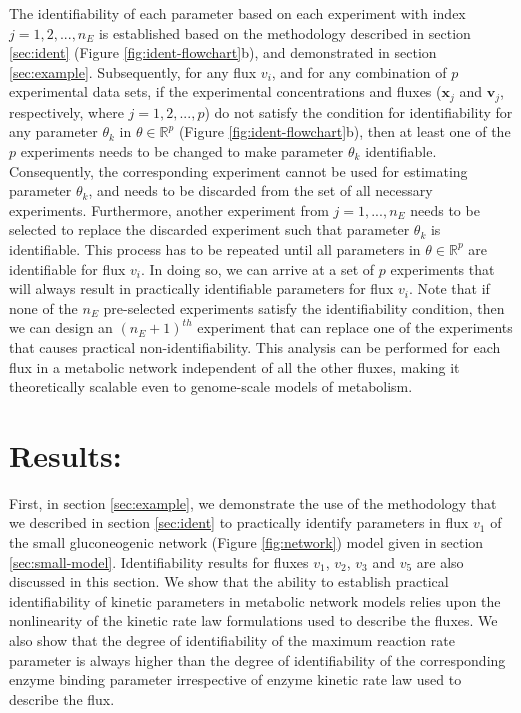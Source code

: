 \documentclass[10pt]{article}
\begin{document}
	The identifiability of each parameter based on each experiment with index $j = {1, 2, ..., n_E}$ is established based on the methodology described in section \ref{sec:ident} (Figure \ref{fig:ident-flowchart}b), and demonstrated in section \ref{sec:example}. Subsequently, for any flux $v_i$, and for any combination of $p$ experimental data sets, if the experimental concentrations and fluxes ($\mathbf{x}_j$ and $\mathbf{v}_j$, respectively, where $j = {1, 2,..., p}$) do not satisfy the condition for identifiability for any parameter $\theta_k$ in $\theta\in\mathbb{R}^p$ (Figure \ref{fig:ident-flowchart}b), then at least one of the $p$ experiments needs to be changed to make parameter $\theta_k$ identifiable. Consequently, the corresponding experiment cannot be used for estimating parameter $\theta_k$, and needs to be discarded from the set of all necessary experiments. Furthermore, another experiment from $j = {1, ..., n_E}$ needs to be selected to replace the discarded experiment such that parameter $\theta_k$ is identifiable. This process has to be repeated until all parameters in $\theta\in\mathbb{R}^p$ are identifiable for flux $v_i$. In doing so, we can arrive at a set of $p$ experiments that will always result in practically identifiable parameters for flux $v_i$. Note that if none of the $n_E$ pre-selected experiments satisfy the identifiability condition, then we can design an $(n_E+1)^{th}$ experiment that can replace one of the experiments that causes practical non-identifiability. This analysis can be performed for each flux in a metabolic network independent of all the other fluxes, making it theoretically scalable even to genome-scale models of metabolism. 	
	
	\section{Results:}
	First, in section \ref{sec:example}, we demonstrate the use of the methodology that we described in section \ref{sec:ident} to practically identify parameters in flux $v_1$ of the small gluconeogenic network (Figure \ref{fig:network}) model given in section \ref{sec:small-model}. Identifiability results for fluxes $v_1$, $v_2$, $v_3$ and $v_5$ are also discussed in this section. We show that the ability to establish practical identifiability of kinetic parameters in metabolic network models relies upon the nonlinearity of the kinetic rate law formulations used to describe the fluxes. We also show that the degree of identifiability of the maximum reaction rate parameter is always higher than the degree of identifiability of the corresponding enzyme binding parameter irrespective of enzyme kinetic rate law used to describe the flux. 
	
\end{document}
